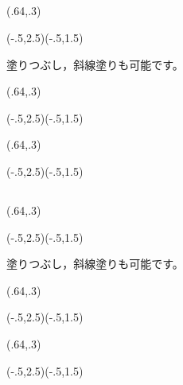 \documentclass[a4j]{jarticle}
\begin{document}
\subsection{\texorpdfstring{}{ougigata}}
\begin{showEx}(.64,.3){}
\begin{pszahyou}[ul=10mm](-.5,2.5)(-.5,1.5)
  \Put{}
\end{pszahyou}
\end{showEx}

塗りつぶし，斜線塗りも可能です。

\begin{showEx}(.64,.3){}
\begin{pszahyou}[ul=10mm](-.5,2.5)(-.5,1.5)
  \Put{}
\end{pszahyou}
\end{showEx}

\begin{showEx}(.64,.3){}
\begin{pszahyou}[ul=10mm](-.5,2.5)(-.5,1.5)
  \Put{}
  \Put{}
\end{pszahyou}
\end{showEx}

\subsection{\texorpdfstring{}{yumigata}}
\begin{showEx}(.64,.3){}
\begin{pszahyou}[ul=10mm](-.5,2.5)(-.5,1.5)
  \Put{}
\end{pszahyou}
\end{showEx}

塗りつぶし，斜線塗りも可能です。

\begin{showEx}(.64,.3){}
\begin{pszahyou}[ul=10mm](-.5,2.5)(-.5,1.5)
  \Put{}
\end{pszahyou}
\end{showEx}

\begin{showEx}(.64,.3){}
\begin{pszahyou}[ul=10mm](-.5,2.5)(-.5,1.5)
  \Put{}
  \Put{}
\end{pszahyou}
\end{showEx}
\end{document}
